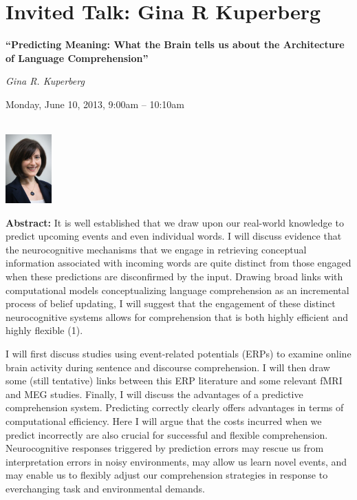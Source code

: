 \section{Invited Talk: Gina R Kuperberg}
\begin{center}

\begin{Large}
{\bfseries\Large ``Predicting Meaning: What the Brain tells us about the Architecture of Language Comprehension''}\vspace{1em}\par
\end{Large}

{\itshape Gina R. Kuperberg}\vspace{1em}\par
Monday, June 10, 2013, 9:00am -- 10:10am \vspace{1em}\\
\PlenaryLoc \\
\vspace{1em}\par 
\includegraphics[height=100px]{content/day2/kuperberg-headshot.pdf}
\end{center}

\noindent
{\bfseries Abstract:} It is well established that we draw upon our real-world knowledge to predict
upcoming events and even individual words. I will discuss evidence that the neurocognitive
mechanisms that we engage in retrieving conceptual information associated with incoming words are
quite distinct from those engaged when these predictions are disconfirmed by the input. Drawing
broad links with computational models conceptualizing language comprehension as an incremental
process of belief updating, I will suggest that the engagement of these distinct neurocognitive
systems allows for comprehension that is both highly efficient and highly flexible (1).

I will first discuss studies using event-related potentials (ERPs) to examine online brain activity
during sentence and discourse comprehension. I will then draw some (still tentative) links between
this ERP literature and some relevant fMRI and MEG studies. Finally, I will discuss the advantages
of a predictive comprehension system. Predicting correctly clearly offers advantages in terms of
computational efficiency. Here I will argue that the costs incurred when we predict incorrectly are
also crucial for successful and flexible comprehension. Neurocognitive responses triggered by
prediction errors may rescue us from interpretation errors in noisy environments, may allow us learn
novel events, and may enable us to flexibly adjust our comprehension strategies in response to
everchanging task and environmental demands.

